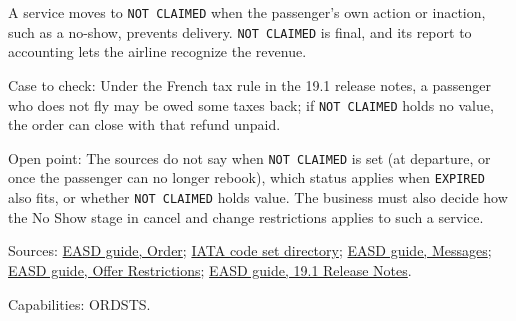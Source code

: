 \begin{definition}
  \label{def:delivery-no-show}
  A service moves to \texttt{NOT CLAIMED} when the passenger's own action or
  inaction, such as a no-show, prevents delivery. \texttt{NOT CLAIMED} is
  final, and its report to accounting lets the airline recognize the
  revenue.

  Case to check: Under the French tax rule in the 19.1 release notes, a
  passenger who does not fly may be owed some taxes back; if \texttt{NOT
  CLAIMED} holds no value, the order can close with that refund unpaid.

  Open point: The sources do not say when \texttt{NOT CLAIMED} is set (at
  departure, or once the passenger can no longer rebook), which status
  applies when \texttt{EXPIRED} also fits, or whether \texttt{NOT CLAIMED}
  holds value. The business must also decide how the No Show stage in cancel
  and change restrictions applies to such a service.

  Sources: \href{https://standards.atlassian.net/wiki/spaces/EASD/pages/574849062/Order}{EASD guide, Order};
  \href{https://standards.atlassian.net/wiki/spaces/AIDM/pages/607420437/View+IATA+Codeset+Directory}{IATA code set directory};
  \href{https://standards.atlassian.net/wiki/spaces/EASD/pages/574652427/Messages}{EASD guide, Messages};
  \href{https://standards.atlassian.net/wiki/spaces/EASD/pages/574259692/Offer+Restrictions}{EASD guide, Offer Restrictions};
  \href{https://standards.atlassian.net/wiki/spaces/EASD/pages/574488757}{EASD guide, 19.1 Release Notes}.

  Capabilities: ORDSTS.
\end{definition}

